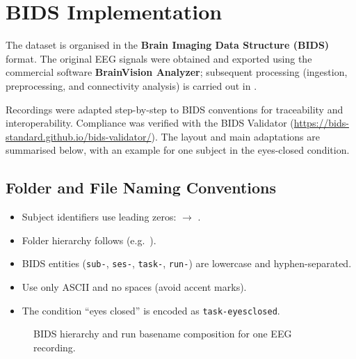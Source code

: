 \appendix

\section{BIDS Implementation}

The dataset is organised in the \textbf{Brain Imaging Data Structure (BIDS)} format. The original EEG signals were obtained and exported using the commercial software \textbf{BrainVision Analyzer}; subsequent processing (ingestion, preprocessing, and connectivity analysis) is carried out in \Julia{}. 

Recordings were adapted step-by-step to BIDS conventions for traceability and interoperability. Compliance was verified with the BIDS Validator (\url{https://bids-standard.github.io/bids-validator/}). The layout and main adaptations are summarised below, with an example for one subject in the eyes-closed condition.

\subsection{Folder and File Naming Conventions}

\begin{tcolorbox}[
  enhanced,
  breakable,
  colback=black!1,
  colframe=black!40,
  boxrule=0.5pt,
  arc=1.5mm,
  left=1.2mm,
  right=1.2mm,
  top=0.8mm,
  bottom=0.8mm,
  title=\textbf{Quick BIDS naming rules}
]
\begin{itemize}[leftmargin=*,itemsep=2pt,topsep=2pt]
\item Subject identifiers use leading zeros:  $\to$ .
\item Folder hierarchy follows  (e.g.\ ).
\item BIDS entities (\texttt{sub-}, \texttt{ses-}, \texttt{task-}, \texttt{run-}) are lowercase and hyphen-separated.
\item Use only ASCII and no spaces (avoid accent marks).
\item The condition ``eyes closed'' is encoded as \texttt{task-eyesclosed}.
\end{itemize}
\end{tcolorbox}

\begin{figure}[H]
\centering
{}
\caption{BIDS hierarchy and run basename composition for one EEG recording.}
\end{figure}

